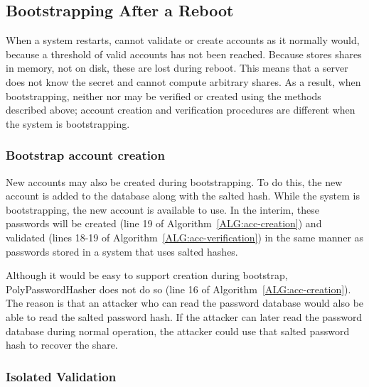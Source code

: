 \subsection{Bootstrapping After a Reboot}
\label{SUBSEC:bootstrapping}

When a system restarts, \PPH cannot validate or create accounts as it normally
would, because a threshold of valid accounts has not been reached. Because \PPH
stores shares in memory, not on disk, these are lost during reboot.  This means
that a server does not know the secret and cannot compute arbitrary shares.  As
a result, when bootstrapping, neither \thresholdaccount nor \thresholdlessaccounts 
may be verified or created using the methods described above; account creation and verification
procedures are different when the system is bootstrapping.  


\subsubsection{Bootstrap account creation}
\label{SUBSUBSEC:bootstrap-account}

New accounts may also be created during bootstrapping. To do this, the new
account is added to the database along with the salted hash.  While the system
is bootstrapping, the new account is available to use.  In the interim, these
passwords will be created (line 19 of Algorithm~\ref{ALG:acc-creation}) and
validated (lines 18-19 of Algorithm~\ref{ALG:acc-verification}) in the same
manner as passwords stored in a system that uses salted hashes.

Although it would be easy to support \thresholdaccount creation during
bootstrap, PolyPasswordHasher does not do so (line 16 of
Algorithm~\ref{ALG:acc-creation}).  The reason is that an attacker who can
read the password database would also be able to read the salted password hash.
If the attacker can later read the password database during normal operation,
the attacker could use that salted password hash to recover the share. 

\subsubsection{Isolated Validation}
\label{SUBSUBSEC:isolated-validation}

